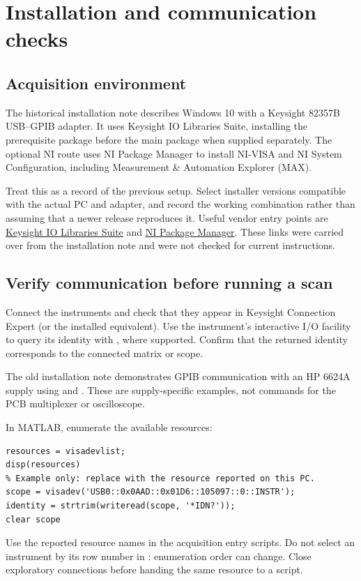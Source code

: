 \section{Installation and communication checks}
\label{sec:installation}
\subsection{Acquisition environment}
The historical installation note describes Windows 10 with a Keysight 82357B USB--GPIB adapter. It uses Keysight IO Libraries Suite, installing the prerequisite package before the main package when supplied separately. The optional NI route uses NI Package Manager to install NI-VISA and NI System Configuration, including Measurement \& Automation Explorer (MAX).

Treat this as a record of the previous setup. Select installer versions compatible with the actual PC and adapter, and record the working combination rather than assuming that a newer release reproduces it. Useful vendor entry points are \href{https://www.keysight.com/us/en/lib/software-detail/computer-software/io-libraries-suite-downloads-2175637.html}{Keysight IO Libraries Suite} and \href{https://www.ni.com/en/support/downloads/software-products/download.package-manager.html}{NI Package Manager}. These links were carried over from the installation note and were not checked for current instructions.

\subsection{Verify communication before running a scan}
Connect the instruments and check that they appear in Keysight Connection Expert (or the installed equivalent). Use the instrument's interactive I/O facility to query its identity with , where supported. Confirm that the returned identity corresponds to the connected matrix or scope.

The old installation note demonstrates GPIB communication with an HP 6624A supply using  and . These are supply-specific examples, not commands for the PCB multiplexer or oscilloscope.

In MATLAB, enumerate the available resources:
\begin{lstlisting}
resources = visadevlist;
disp(resources)
% Example only: replace with the resource reported on this PC.
scope = visadev('USB0::0x0AAD::0x01D6::105097::0::INSTR');
identity = strtrim(writeread(scope, '*IDN?'));
clear scope
\end{lstlisting}
Use the reported resource names in the acquisition entry scripts. Do not select an instrument by its row number in : enumeration order can change. Close exploratory connections before handing the same resource to a script.

